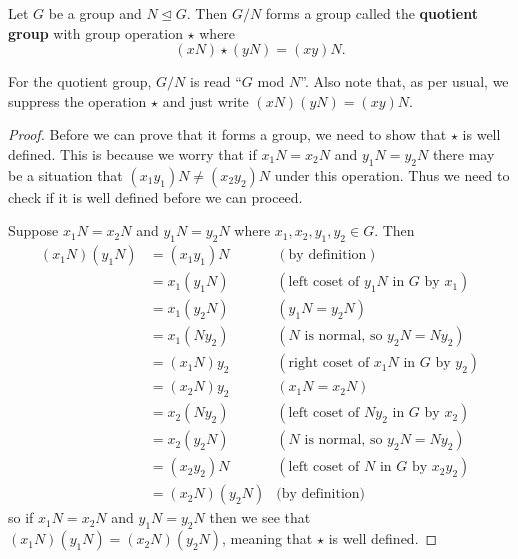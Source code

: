 \begin{theorem}\label{thrm-quotient-group-requirement}
    Let $G$ be a group and $N \unlhd G$. Then $G / N$ forms a group called the \textbf{quotient group} with group operation $\star$ where
    \[
        (xN) \star (yN) = (xy)N.
    \]
\end{theorem}
For the quotient group, $G / N$ is read ``$G$ mod $N$''. Also note that, as per usual, we suppress the operation $\star$ and just write $(xN)(yN) = (xy)N$.
\begin{proof}
    Before we can prove that it forms a group, we need to show that $\star$ is well defined. This is because we worry that if $x_1N = x_2N$ and $y_1N = y_2N$ there may be a situation that $(x_1y_1)N \neq (x_2y_2)N$ under this operation. Thus we need to check if it is well defined before we can proceed.

    Suppose $x_1N = x_2N$ and $y_1N = y_2N$ where $x_1, x_2, y_1, y_2 \in G$. Then
    \begin{align*}
        (x_1N)(y_1N) &= (x_1y_1)N & (\text{by definition})\\
        &= x_1(y_1N) & (\text{left coset of } y_1N \text{ in } G \text{ by } x_1)\\
        &= x_1(y_2N) & (y_1N = y_2N)\\
        &= x_1(Ny_2) & (N \text{ is normal, so } y_2N=Ny_2)\\
        &= (x_1N)y_2 & (\text{right coset of } x_1N \text{ in } G \text{ by } y_2)\\
        &= (x_2N)y_2 & (x_1N = x_2N)\\
        &= x_2(Ny_2) & (\text{left coset of } Ny_2 \text{ in } G \text{ by } x_2)\\
        &= x_2(y_2N) & (N \text{ is normal, so } y_2N=Ny_2)\\
        &= (x_2y_2)N & (\text{left coset of } N \text{ in } G \text{ by } x_2y_2)\\
        &= (x_2N)(y_2N) & \text{(by definition)}
    \end{align*}
    so if $x_1N = x_2N$ and $y_1N = y_2N$ then we see that $(x_1N)(y_1N) = (x_2N)(y_2N)$, meaning that $\star$ is well defined.


\end{proof}
